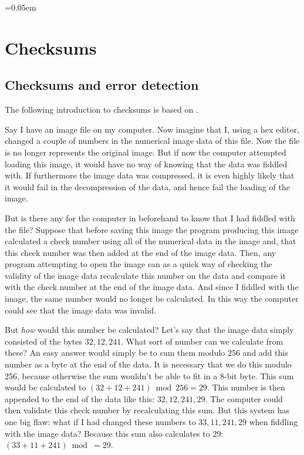 \begin{comment}
  
\end{comment}


\begingroup
\arraycolsep=0.05em


\chapter{Checksums}
\label{cha:crc}

\section{Checksums and error detection}

The following introduction to checksums is based on
\cite{Williams_1993_crc_painless,barr:_addit_check,tanenbaum2003computernetworks_crc,Nelson:1992:FVU:135011.135017_crc32}.

Say I have an image file on my computer. Now imagine that I, using a
hex editor, changed a couple of numbers in the numerical image data of
this file. Now the file is no longer represents the original
image. But if now the computer attempted loading this image, it would
have no way of knowing that the data was fiddled with. If furthermore
the image data was compressed, it is even highly likely that it would
fail in the decompression of the data, and hence fail the loading of
the image.

But is there any for the computer in beforehand to know that I had
fiddled with the file? Suppose that before saving this image the
program producing this image calculated a check number using all of
the numerical data in the image and, that this check number was then
added at the end of the image data. Then, any program attempting to
open the image can as a quick way of checking the validity of the
image data recalculate this number on the data and compare it with the
check number at the end of the image data. And since I fiddled with
the image, the same number would no longer be calculated. In this way
the computer could see that the image data was invalid.

But \textit{how} would this number be calculated? Let's say that the
image data simply consisted of the bytes $32,12,241$. What sort of
number can we calculate from these? An easy answer would simply be to
sum them modulo $256$ and add this number as a byte at the end of the
data. It is necessary that we do this modulo 256, because otherwise
the sum wouldn't be able to fit in a 8-bit byte. This sum would be
calculated to $(32 + 12 + 241) \bmod 256 = 29$. This number is then
appended to the end of the data like this: $32,12,241,29$. The
computer could then validate this check number by recalculating this
sum. But this system has one big flaw: what if I had changed these
numbers to $33,11,241, 29$ when fiddling with the image data?  Because
this sum also calculates to 29: $(33 + 11 + 241) \bmod = 29$.

